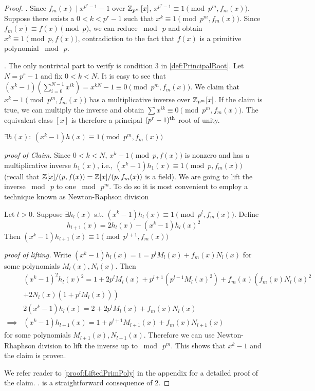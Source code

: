 \begin{proof}
    . \quad Since \(f_m(x) \mid x^{p^r -  1} - 1\) over \(\mathbb{Z}_{p^m}[x]\), \(x^{p^r - 1} \equiv 1 \pmod{p^m, f_m(x)}\). Suppose there exists a \(0 < k < p^r - 1\) such that \(x^k \equiv 1 \pmod{p^m, f_m(x)}\). Since \(f_m(x) \equiv f(x) \pmod{p}\), we can reduce \(\bmod \  p\) and obtain \(x^k \equiv 1 \pmod{p, f(x)}\), contradiction to the fact that \(f(x)\) is a primitive polynomial \(\bmod \  p\).

    \smallskip
    . \quad The only nontrivial part to verify is condition 3 in \cref{def:PrincipalRoot}. Let \(N = p^r - 1\) and fix \(0 < k < N\). It is easy to see that \((x^k - 1)(\sum_{i=0}^{N-1} x^{ik}) = x^{kN} - 1 \equiv 0 \pmod{p^m, f_m(x)}\). We claim that \(x^k - 1 \pmod{p^m, f_m(x)}\) has a multiplicative inverse over \(\mathbb{Z}_{p^m}[x]\). If the claim is true, we can multiply the inverse and obtain \(\sum x^{ik} \equiv 0 \pmod{p^m, f_m(x)}\). The equivalent class \([x]\) is therefore a principal \((p^r - 1)\textsuperscript{th}\) root of unity.

    \ifFullVersion
    \medskip
     \(\exists h(x):\: (x^k - 1)h(x) \equiv 1 \pmod{p^m, f_m(x)}\)

    \noindent\emph{proof of Claim.} \quad Since \(0 < k < N\), \(x^k - 1 \pmod{p, f(x)}\) is nonzero and has a multiplicative inverse \(h_1(x)\), i.e., \((x^k - 1)h_1(x) \equiv 1 \pmod{p, f_m(x)}\) (recall that \(\mathbb{Z}[x]/(p, f(x)) = \mathbb{Z}[x]/(p, f_m(x))\) is a field). We are going to lift the inverse \(\bmod \  p\) to one \(\bmod \  p^m\). To do so it is most convenient to employ a technique known as Newton-Raphson division~\cite{MISC:WikiNewton}

    \smallskip
    Let \(l > 0\). Suppose \(\exists h_l(x)\) s.t. \((x^k - 1)h_l(x) \equiv 1 \pmod{p^l, f_m(x)}\). Define
    \[h_{l+1}(x) = 2 h_l(x) - (x^k - 1)h_l(x)^2\]
    Then \((x^k - 1)h_{l+1}(x) \equiv 1 \pmod{p^{l+1}, f_m(x)}\)

    \noindent\emph{proof of lifting.} \quad Write \((x^k - 1)h_l(x) = 1 = p^l M_l(x) + f_m(x) N_l(x)\) for some polynomials \(M_l(x), N_l(x)\). Then
    \begin{align*}
        &(x^k - 1)^2h_l(x)^2 = 1 + 2p^l M_l(x) + p^{l+1}(p^{l-1}M_l(x)^2) + f_m(x)\left(f_m(x) N_l(x)^2  \right.\\
        &\left. + 2 N_l(x) (1 + p^l M_l(x)) \right) \\
        &2(x^k - 1)h_l(x) = 2 + 2p^l M_l(x) + f_m(x) N_l(x) \\
        \implies &(x^k - 1)h_{l+1}(x) = 1 + p^{l+1} M_{l+1}(x) + f_m(x) N_{l+1}(x)
    \end{align*}
    for some polynomials \(M_{l+1}(x), N_{l+1}(x)\). Therefore we can use Newton-Rhaphson division to lift the inverse up to \(\bmod \  p^m\). This shows that \(x^k - 1\) and the claim is proven.

    \medskip
    \else
    We refer reader to \cref{proof:LiftedPrimPoly} in the appendix for a detailed proof of the claim.
    \fi
    . \quad is a straightforward consequence of 2.
\end{proof}

